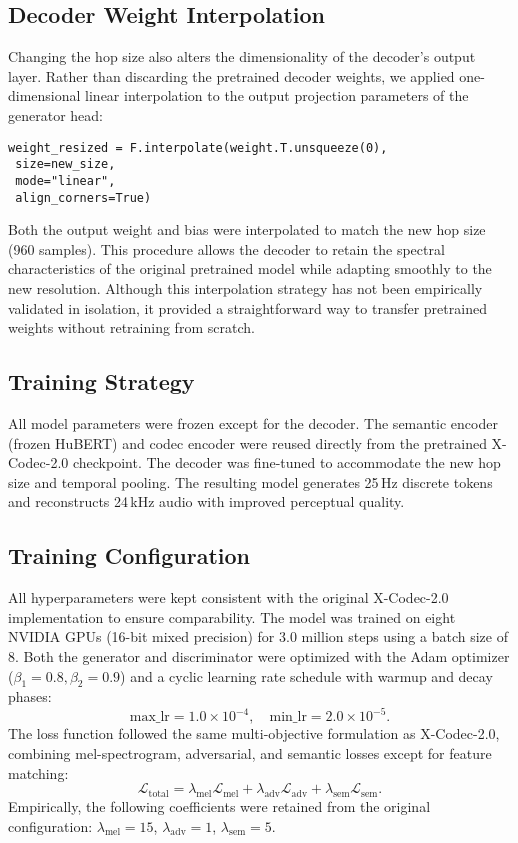 \documentclass[preprint]{article}
\begin{document}
\subsection{Decoder Weight Interpolation}
Changing the hop size also alters the dimensionality of the decoder's output layer. Rather than discarding the pretrained decoder weights, we applied one-dimensional linear interpolation to the output projection parameters of the generator head:
\begin{verbatim}
weight_resized = F.interpolate(weight.T.unsqueeze(0),
 size=new_size,
 mode="linear",
 align_corners=True)
\end{verbatim}

Both the output weight and bias were interpolated to match the new hop size (960 samples). This procedure allows the decoder to retain the spectral characteristics of the original pretrained model while adapting smoothly to the new resolution. Although this interpolation strategy has not been empirically validated in isolation, it provided a straightforward way to transfer pretrained weights without retraining from scratch.

\subsection{Training Strategy}
All model parameters were frozen except for the decoder. The semantic encoder (frozen HuBERT) and codec encoder were reused directly from the pretrained X-Codec-2.0 checkpoint. The decoder was fine-tuned to accommodate the new hop size and temporal pooling. The resulting model generates 25\,Hz discrete tokens and reconstructs 24\,kHz audio with improved perceptual quality.

\subsection{Training Configuration}
All hyperparameters were kept consistent with the original X-Codec-2.0 implementation to ensure comparability. The model was trained on eight NVIDIA GPUs (16-bit mixed precision) for 3.0 million steps using a batch size of 8. Both the generator and discriminator were optimized with the Adam optimizer (\(\beta_1 = 0.8, \beta_2 = 0.9\)) and a cyclic learning rate schedule with warmup and decay phases:
\[
\text{max\_lr} = 1.0\times10^{-4}, \quad
\text{min\_lr} = 2.0\times10^{-5}.
\]
The loss function followed the same multi-objective formulation as X-Codec-2.0, combining mel-spectrogram, adversarial, and semantic losses except for feature matching:
\[
\mathcal{L}_{\text{total}} =
\lambda_{\text{mel}}\mathcal{L}_{\text{mel}} +
\lambda_{\text{adv}}\mathcal{L}_{\text{adv}} +
\lambda_{\text{sem}}\mathcal{L}_{\text{sem}}.
\]
Empirically, the following coefficients were retained from the original configuration:
\(\lambda_{\text{mel}}=15\),
\(\lambda_{\text{adv}}=1\),
\(\lambda_{\text{sem}}=5\).
\end{document}
